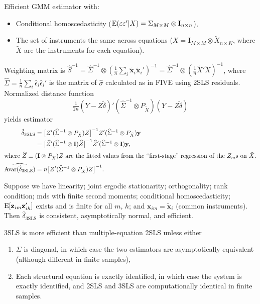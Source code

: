 \documentclass[8pt,letterpaper, landscape]{extarticle} %
\newcommand{\mx}{\ensuremath{\mathbf{x}}}
\newcommand{\mI}{\ensuremath{\mathbf{I}}}
\begin{document}
\begin{multicols}{3}
\begin{description}
Efficient GMM estimator with:
\begin{itemize}
\item Conditional homoscedasticity ($ \E (\epsilon \epsilon' | X) = \Sigma_{M \times M} \otimes \mI_{n \times n} $),
\item The set of instruments the same across equations ($ X = \mI_{M \times M} \otimes \tilde{X}_{n \times K} $, where $ \tilde{X} $ are the instruments for each equation).
\end{itemize}
Weighting matrix is $ \widehat{S}^{-1} = \widehat{\Sigma}^{-1} \otimes (\tfrac{1}{n} \sum_{i} \tilde{\mx}_i \tilde{\mx}_{i}')^{-1} = \widehat{\Sigma}^{-1} \otimes (\tfrac{1}{n} \tilde{X}' \tilde{X})^{-1} $, where $ \widehat{\Sigma} = \tfrac{1}{n} \sum_{i} \hat{\epsilon}_i \hat{\epsilon}_{i}'  $ is the matrix of $ \hat{\sigma} $ calculated as in FIVE using 2SLS residuals. Normalized distance function
\[ \tfrac{1}{2n}(Y - Z \tilde{\delta})' (\widehat{\Sigma}^{-1} \otimes P_{\tilde{X}}) (Y - Z \tilde{\delta}) \]
yields estimator
\begin{align*}
 \hat{\delta}_{\text{3SLS}} &= \bigl [ Z' (\widehat{\Sigma}^{-1} \otimes P_{\tilde{X}}) Z \bigr ]^{-1} Z' (\widehat{\Sigma}^{-1} \otimes P_{\tilde{X}}) \mathbf{y} \\
&= \bigl [ \widehat{Z}' (\widehat{\Sigma}^{-1} \otimes \mI) \widehat{Z} \bigr ]^{-1} \widehat{Z}' (\widehat{\Sigma}^{-1} \otimes \mI) \mathbf{y} , \\
\intertext{where $ \widehat{Z} \equiv (\mI \otimes P_{\tilde{X}}) Z $ are the fitted values from the ``first-stage'' regression of the $ Z_m $s on $ \tilde{X} $.}
\widehat{\Avar (\hat{\delta}_{\text{3SLS}})} &= n \bigl [ Z' (\widehat{\Sigma}^{-1} \otimes P_{\tilde{X}}) Z \bigr ]^{-1} .
\end{align*}

Suppose we have linearity; joint ergodic stationarity; orthogonality; rank condition; mds with finite second moments; conditional homoscedasticity; $ \operatorname{E} [\mathbf{z}_{im} \mathbf{z}_{ih}'] $ exists and is finite for all $ m $, $ h $; and $ \mx_{im} = \tilde{\mx}_{i} $ (common instruments). Then $ \hat{\delta}_{\text{3SLS}} $ is consistent, asymptotically normal, and efficient.

3SLS is more efficient than multiple-equation 2SLS unless either
\begin{enumerate}
\item $ \Sigma $ is diagonal, in which case the two estimators are asymptotically equivalent (although different in finite samples),
\item Each structural equation is exactly identified, in which case the system is exactly identified, and 2SLS and 3SLS are computationally identical in finite samples.
\end{enumerate}


\end{description}
\end{multicols}
\end{document}
